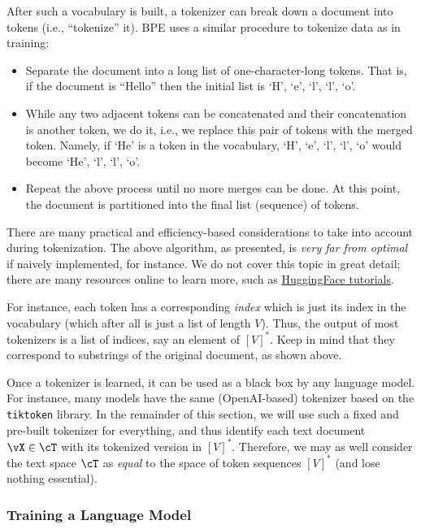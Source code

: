 \documentclass[../../book-main.tex]{subfiles}
\begin{document}
After such a vocabulary is built, a tokenizer can break down a document into tokens (i.e., ``tokenize'' it). BPE uses a similar procedure to tokenize data as in training:
\begin{itemize}
    \item Separate the document into a long list of one-character-long tokens. That is, if the document is ``Hello'' then the initial list is `H', `e', `l', `l', `o'. 
    \item While any two adjacent tokens can be concatenated and their concatenation is another token, we do it, i.e., we replace this pair of tokens with the merged token. Namely, if `He' is a token in the vocabulary, `H', `e', `l', `l', `o' would become `He', `l', `l', `o'.
    \item Repeat the above process until no more merges can be done. At this point, the document is partitioned into the final list (sequence) of tokens.
\end{itemize}

There are many practical and efficiency-based considerations to take into account during tokenization. The above algorithm, as presented, is \textit{very far from optimal} if naively implemented, for instance. We do not cover this topic in great detail; there are many resources online to learn more, such as \href{https://huggingface.co/learn/nlp-course/en/chapter6/5}{HuggingFace tutorials}.

For instance, each token has a corresponding \textit{index} which is just its index in the vocabulary (which after all is just a list of length \(V\)). Thus, the output of most tokenizers is a list of indices, say an element of \([V]^{*}\). Keep in mind that they correspond to substrings of the original document, as shown above.

Once a tokenizer is learned, it can be used as a black box by any language model. For instance, many models have the same (OpenAI-based) tokenizer based on the \texttt{tiktoken} library. In the remainder of this section, we will use such a fixed and pre-built tokenizer for everything, and thus identify each text document \(\vX \in \cT\) with its tokenized version in \([V]^{*}\). Therefore, we may as well consider the text space \(\cT\) as \textit{equal} to the space of token sequences \([V]^{*}\) (and lose nothing essential).

\subsubsection{Training a Language Model}
\end{document}
